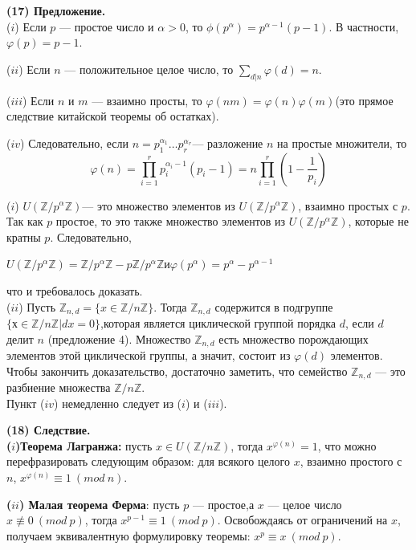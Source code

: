 \textbf{(17) Предложение.} \\
($i$) Если $p$ --- простое число и $\alpha > 0$, то $\phi(p^{\alpha}) = p^{\alpha - 1}(p - 1)$. В частности, $\varphi(p) = p - 1$. \par
($ii$) Если $n$ --- положительное целое число, то $\sum_{d|n}\varphi(d) = n$. \par
($iii$) Если $n$ и $m$ --- взаимно просты, то $\varphi(nm) = \varphi(n)\varphi(m)$(это прямое следствие китайской теоремы об остатках).\par  
($iv$) Следовательно, если $n = p_1^{\alpha_1} \ldots p_r^{\alpha_r}$--- разложение $n$ на простые множители, то
$$\varphi(n) = \prod\limits_{i = 1}^{r}p_{i}^{\alpha_{i}-1}(p_{i} - 1) = n\prod\limits_{i = 1}^{r}(1 - \frac{1}{p_i})$$
\begin{myproof}
($i$) $U(\mathbb{Z}/p^{\alpha}\mathbb{Z})$--- это множество элементов из $U(\mathbb{Z}/p^{\alpha}\mathbb{Z})$, взаимно простых с $p$. Так как $p$ простое, то это также множество элементов из $U(\mathbb{Z}/p^{\alpha}\mathbb{Z})$, которые не кратны $p$. Следовательно,
\begin{center}
$U(\mathbb{Z}/p^{\alpha}\mathbb{Z}) =\mathbb{Z}/p^{\alpha}\mathbb{Z} - p\mathbb{Z}/p^{\alpha}\mathbb{Z}$\enskip и\enskip $\varphi(p^{\alpha}) = p^{\alpha} - p^{\alpha - 1}$
\end{center}
что и требовалось доказать.  \\
($ii$) Пусть $\mathbb{Z}_{n,d} = \{x \in \mathbb{Z}/n\mathbb{Z} \}$. Тогда $\mathbb{Z}_{n,d}$ содержится в подгруппе $\{ х \in \mathbb{Z}/n\mathbb{Z} | dx = 0 \}$,которая является циклической группой порядка $d$, если $d$ делит $n$ (предложение 4). Множество  $\mathbb{Z}_{n,d}$ есть множество порождающих элементов этой циклической группы, а значит, состоит из $\varphi (d)$ элементов. Чтобы закончить доказательство, достаточно заметить, что семейство $\mathbb{Z}_{n,d}$ --- это разбиение множества $\mathbb{Z}/n\mathbb{Z}$. \\
Пункт ($iv$) немедленно следует из ($i$) и ($iii$).
\end{myproof}
\textbf{(18) Следствие.} \\
  \textbf{($i$)Теорема Лагранжа:} пусть $x \in U(\mathbb{Z}/n\mathbb{Z})$, тогда $x^{\varphi (n)} = 1$, что можно перефразировать следующим образом: для всякого целого $x$, взаимно простого с $n$, $x^{\varphi(n)} \equiv 1\ (mod\ n)$. \par
  \textbf{($ii$) Малая теорема Ферма}: пусть $p$ --- простое,а $x$ — целое 
число $x \not\equiv 0\ (mod\ p)$, тогда $x^{p - 1} \equiv 1\ (mod\ p)$. Освобождаясь от ограничений на $x$, получаем эквивалентную формулировку теоремы: $x^{p}\equiv x\ (mod\ p)$.
\pagebreak
\newpage

